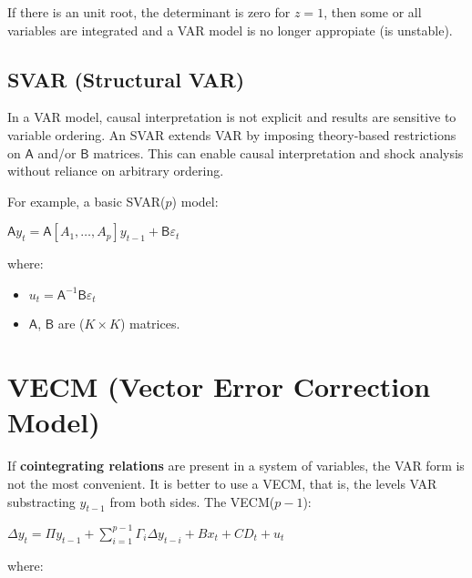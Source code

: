 \documentclass[10pt, a4paper, landscape]{article}
\begin{document}
\begin{multicols}{2}
		If there is an unit root, the determinant is zero for $z = 1$, then some or all variables are integrated and a VAR model is no longer appropiate (is unstable).
		
		\subsection*{SVAR (Structural VAR)}

		In a VAR model, causal interpretation is not explicit and results are sensitive to variable ordering. An SVAR extends VAR by imposing theory-based restrictions on $\mathsf{A}$ and/or $\mathsf{B}$ matrices. This can enable causal interpretation and shock analysis without reliance on arbitrary ordering.
		
		For example, a basic SVAR($p$) model:
		
		\begin{center}
			$\mathsf{A} y_t = \mathsf{A} [A_1, \ldots, A_p] y_{t - 1} + \mathsf{B} \varepsilon_t$
		\end{center}
		
		where:
		
		\begin{itemize}[leftmargin=*]
			\item $u_t = \mathsf{A}^{-1} \mathsf{B} \varepsilon_t$
			\item $\mathsf{A}$, $\mathsf{B}$ are ($K \times K$) matrices.
		\end{itemize}
		
		\columnbreak
		
		\section*{VECM (Vector Error Correction Model)}
		
		If \textbf{cointegrating relations} are present in a system of variables, the VAR form is not the most convenient. It is better to use a VECM, that is, the levels VAR substracting $y_{t - 1}$ from both sides. The VECM($p - 1$):
		
		\begin{center}
			$\Delta y_{t} = \Pi y_{t - 1} + \sum_{i = 1}^{p - 1} \Gamma_{i} \Delta y_{t - i} + B x_{t} + CD_{t} + u_{t}$
		\end{center}
		
		where:
		

\end{multicols}
\end{document}
